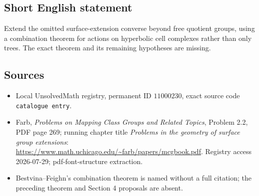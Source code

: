 \documentclass[11pt]{article}
\begin{document}
\subsection{Short English statement}
Extend the omitted surface-extension converse beyond free quotient groups, using a combination theorem for actions on hyperbolic cell complexes rather than only trees. The exact theorem and its remaining hypotheses are missing.
\subsection{Sources}
\begin{itemize}
\item Local UnsolvedMath registry, permanent ID \(11000230\), exact source code \texttt{catalogue entry}.
\item Farb, \emph{Problems on Mapping Class Groups and Related Topics}, Problem 2.2, PDF page 269; running chapter title \emph{Problems in the geometry of surface group extensions}: \url{https://www.math.uchicago.edu/~farb/papers/mcgbook.pdf}. Registry access 2026-07-29; pdf-font-structure extraction.
\item Bestvina--Feighn's combination theorem is named without a full citation; the preceding theorem and Section 4 proposals are absent.
\end{itemize}
\end{document}
